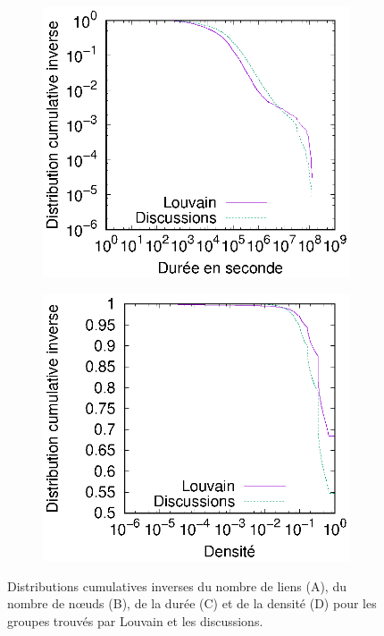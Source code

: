 \begin{figure}[h]
	\begin{subfigure}{0.4\textwidth}
		\includegraphics[width=\linewidth]{img/mailing/Detection/duree}\hfill
		\caption{}		
	\end{subfigure}
	\begin{subfigure}{0.4\textwidth}
		\includegraphics[width=\linewidth]{img/mailing/Detection/densite}
		\caption{\label{fig:dens_mail_louvain}}		
	\end{subfigure}
\caption{Distributions cumulatives inverses du nombre de liens (A), du nombre de n\oe{}uds (B), de la durée (C) et de la densité (D) pour les groupes trouvés par Louvain et les discussions.}
\label{fig:carac_mail_louvain}
\end{figure}



